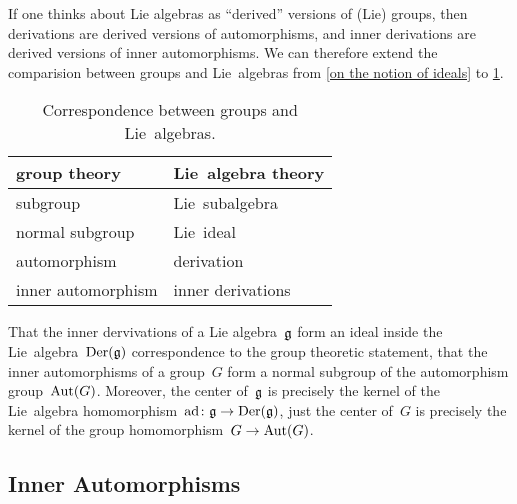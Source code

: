 \begin{remark}
  If one thinks about Lie algebras as \enquote{derived} versions of (Lie) groups, then derivations are derived versions of automorphisms, and inner derivations are derived versions of inner automorphisms.
  We can therefore extend the comparision between groups and Lie~algebras from \cref{on the notion of ideals} to \cref{correspondence between groups and lie algebras}.
  \begin{table}
    \centering
    \begin{tabular}{ll}
      \toprule
      group theory
      &
      Lie~algebra theory
      \\
      \midrule
      subgroup
      &
      Lie~subalgebra
      \\
      normal subgroup
      &
      Lie~ideal
      \\
      automorphism
      &
      derivation
      \\
      inner automorphism
      &
      inner derivations
      \\
      \bottomrule
    \end{tabular}
    \caption{Correspondence between groups and Lie~algebras.}
    \label{correspondence between groups and lie algebras}
  \end{table}

  That the inner dervivations of a Lie algebra~$\mathfrak{g}$ form an ideal inside the Lie~algebra~$\operatorname{Der}(\mathfrak{g})$ correspondence to the group theoretic statement, that the inner automorphisms of a group~$G$ form a normal subgroup of the automorphism group~$\operatorname{Aut}(G)$.
  Moreover, the center of~$\mathfrak{g}$ is precisely the kernel of the Lie~algebra homomorphism~$\ad \colon \glie \to \Der(\glie)$, just the center of~$G$ is precisely the kernel of the group homomorphism~$G \to \Aut(G)$.
\end{remark}



\subsection{Inner Automorphisms}


